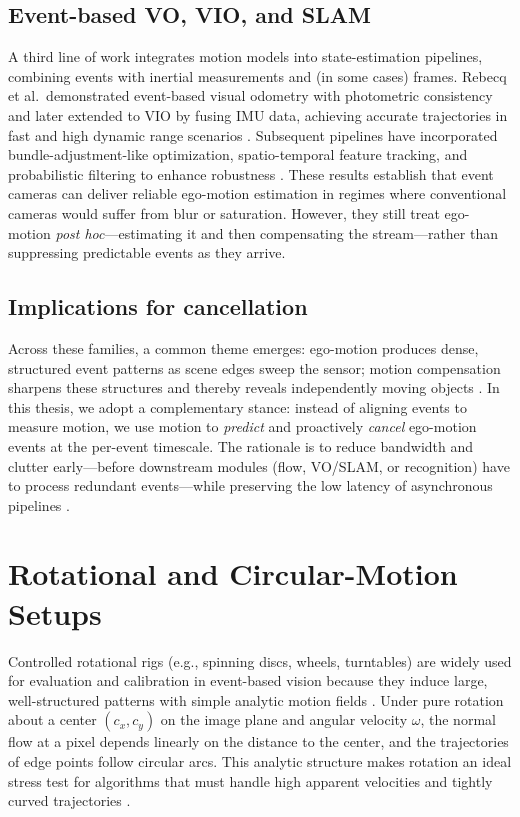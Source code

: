 \subsection{Event-based VO, VIO, and SLAM}
A third line of work integrates motion models into state-estimation pipelines, combining events with inertial measurements and (in some cases) frames. Rebecq et al.\ demonstrated event-based visual odometry with photometric consistency and later extended to VIO by fusing IMU data, achieving accurate trajectories in fast and high dynamic range scenarios \cite{Rebecq2017EVO,Rebecq2019E2VID}. Subsequent pipelines have incorporated bundle-adjustment-like optimization, spatio-temporal feature tracking, and probabilistic filtering to enhance robustness \cite{Gallego2020Survey}. These results establish that event cameras can deliver reliable ego-motion estimation in regimes where conventional cameras would suffer from blur or saturation. However, they still treat ego-motion \emph{post hoc}—estimating it and then compensating the stream—rather than suppressing predictable events as they arrive.

\subsection{Implications for cancellation}
Across these families, a common theme emerges: ego-motion produces dense, structured event patterns as scene edges sweep the sensor; motion compensation sharpens these structures and thereby reveals independently moving objects \cite{Stoffregen2019Segmentation}. In this thesis, we adopt a complementary stance: instead of aligning events to measure motion, we use motion to \emph{predict} and proactively \emph{cancel} ego-motion events at the per-event timescale. The rationale is to reduce bandwidth and clutter early—before downstream modules (flow, VO/SLAM, or recognition) have to process redundant events—while preserving the low latency of asynchronous pipelines \cite{Gallego2018CMax,Bardow2016SOFIE}.

\section{Rotational and Circular-Motion Setups}
\label{sec:rotational-setups}

Controlled rotational rigs (e.g., spinning discs, wheels, turntables) are widely used for evaluation and calibration in event-based vision because they induce large, well-structured patterns with simple analytic motion fields \cite{Gallego2017Angular,Stoffregen2019Segmentation}. Under pure rotation about a center $(c_x,c_y)$ on the image plane and angular velocity $\omega$, the normal flow at a pixel depends linearly on the distance to the center, and the trajectories of edge points follow circular arcs. This analytic structure makes rotation an ideal stress test for algorithms that must handle high apparent velocities and tightly curved trajectories \cite{Gallego2017Angular}.


